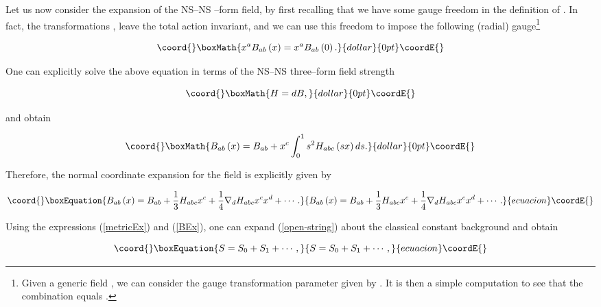\documentclass[a4paper,11pt]{article}
\begin{document}
\noindent
Let us now consider the expansion of the NS--NS \coordHE{}--form field, by first
recalling that we have some gauge freedom in the definition of \coordHE{}. In fact, the transformations \coordHE{}, 
\coordHE{} leave the total action \coordHE{} invariant, and we
can use this freedom to impose the following (radial) gauge\footnote{Given 
a generic field \coordHE{}, we can consider the gauge
transformation parameter \coordHE{} given by \coordHE{}. It is
then a simple computation to see that the combination \coordHE{} equals \coordHE{}.} 

$$\coord{}\boxMath{
x^{a}B_{ab}\left( x\right) =x^{a}B_{ab}\left( 0\right) .
}{dollar}{0pt}\coordE{}$$

\noindent
One can explicitly solve the above equation in terms of the NS--NS 
three--form field strength

$$\coord{}\boxMath{
H=dB,
}{dollar}{0pt}\coordE{}$$

\noindent
and obtain 

$$\coord{}\boxMath{
B_{ab}\left( x\right) =B_{ab}+x^{c}\int_{0}^{1}s^{2}H_{abc}\left( sx\right)
ds.
}{dollar}{0pt}\coordE{}$$

\noindent
Therefore, the normal coordinate expansion for the field \coordHE{} is
explicitly given by

\begin{equation}\coord{}\boxEquation{
B_{ab}\left( x\right) =B_{ab}+\frac{1}{3}H_{abc}x^{c}+\frac{1}{4}\nabla
_{d}H_{abc}x^{c}x^{d}+\cdots .
\label{BEx}
}{
B_{ab}\left( x\right) =B_{ab}+\frac{1}{3}H_{abc}x^{c}+\frac{1}{4}\nabla
_{d}H_{abc}x^{c}x^{d}+\cdots .
}{ecuacion}\coordE{}\end{equation}

Using the expressions (\ref{metricEx}) and (\ref{BEx}), one can expand 
(\ref{open-string}) about the classical constant background \coordHE{} and 
obtain

\begin{equation}\coord{}\boxEquation{
S=S_{0}+S_{1}+\cdots ,
\label{exp}
}{
S=S_{0}+S_{1}+\cdots ,
}{ecuacion}\coordE{}\end{equation}
\end{document}
